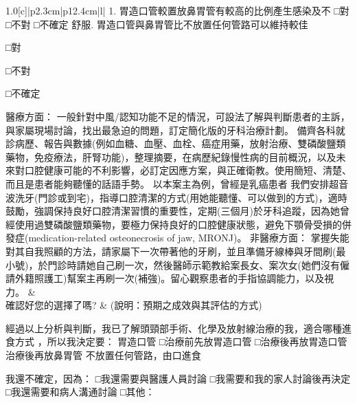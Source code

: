\documentclass[12pt, a4paper]{article}
\begin{document}
\begin{xltabular}{1.0\linewidth}[c]{|p{2.3cm}|p{12.4cm}|l|}
  1. 胃造口管較置放鼻胃管有較高的比例產生感染及不
□對
□不對
□不確定
舒服. 胃造口管與鼻胃管比不放置任何管路可以維持較佳

□對

□不對

□不確定\newline 


  
  醫療方面： 一般針對中風/認知功能不足的情況，可設法了解與判斷患者的主訴，與家屬現場討論，找出最急迫的問題，訂定簡化版的牙科治療計劃。 備齊各科就診病歷、報告與數據(例如血糖、血壓、血栓、癌症用藥，放射治療、雙磷酸鹽類藥物，免疫療法，肝腎功能)，整理摘要，在病歷紀錄慢性病的目前概況，以及未來對口腔健康可能的不利影響，必訂定因應方案，與正確衛教。使用簡短、清楚、而且是患者能夠聽懂的話語手勢。\newline 
   以本案主為例，曾經是乳癌患者
   我們安排超音波洗牙(門診或到宅)，指導口腔清潔的方式(用她能聽懂、可以做到的方式)，適時鼓勵，強調保持良好口腔清潔習慣的重要性，定期(三個月)於牙科追蹤，因為她曾經使用過雙磷酸鹽類藥物，要極力保持良好的口腔健康狀態，避免下顎骨受損的併發症(medication-related osteonecrosis of jaw, MRONJ)。\newline 
   非醫療方面： 掌握失能對其自我照顧的方法，請家屬下一次帶著他的牙刷，並且準備牙線棒與牙間刷(最小號)，於門診時請她自己刷一次，然後醫師示範教給案長女、案次女(她們沒有僱請外籍照護工)幫案主再刷一次(補強)。留心觀察患者的手指協調能力，以及視力。 &
   \\ \hline
確認好您的選擇了嗎? &
  {\color[HTML]{C0C0C0}(說明：預期之成效與其評估的方式)}\newline 
  
  經過以上分析與判斷，我已了解頭頸部手術、化學及放射線治療的我，適合哪種進食方式 ，所以我決定要：\newline 
胃造口管\newline 
□治療前先放胃造口管\newline 
□治療後再放胃造口管\newline 
治療後再放鼻胃管\newline 
不放置任何管路，由口進食\newline 

我還不確定，因為：\newline 
□我還需要與醫護人員討論\newline 
□我需要和我的家人討論後再決定\newline 
□我還需要和病人溝通討論\newline 
□其他： 	\newline 
  

\end{xltabular}
\end{document}
